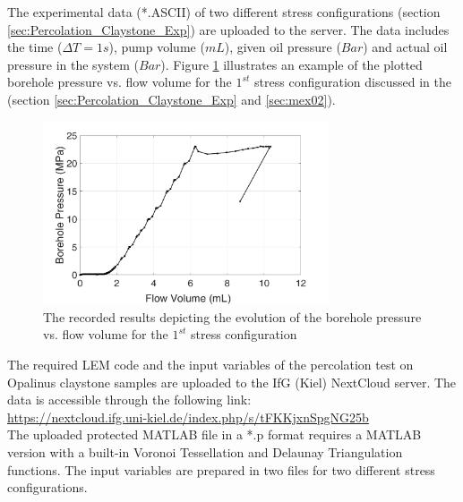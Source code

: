 The experimental data (*.ASCII) of two different stress configurations (section \ref{sec:Percolation_Claystone_Exp}) are uploaded to the server. The data includes the time ($\Delta T=1s$), pump volume ($mL$), given oil pressure ($Bar$) and actual oil pressure in the system ($Bar$). Figure \ref{fig:Amir_Percolation_Flow_a_Data}
illustrates an example of the plotted borehole pressure vs. flow volume for the $1^{st}$ stress configuration discussed in the (section \ref{sec:Percolation_Claystone_Exp} and \ref{sec:mex02}).

\begin{figure}[!ht]
\centering
\includegraphics[width=0.75\textwidth]{figures/Amir_Percolation_Flow_a_Data.png}
\caption{The recorded results depicting the evolution of the borehole pressure vs. flow volume for the $1^{st}$ stress configuration}
\label{fig:Amir_Percolation_Flow_a_Data}
\end{figure}

The required LEM code and the input variables of the percolation test on Opalinus claystone samples are uploaded to the IfG (Kiel) NextCloud server. The data is accessible through the following link:\\
\hyperlink{https://nextcloud.ifg.uni-kiel.de/index.php/s/tFKKjxnSpgNG25b}{https://nextcloud.ifg.uni-kiel.de/index.php/s/tFKKjxnSpgNG25b}\\

The uploaded protected MATLAB file in a *.p format requires a MATLAB version with a built-in Voronoi Tessellation and Delaunay Triangulation functions. The input variables are prepared in two files for two different stress configurations.

